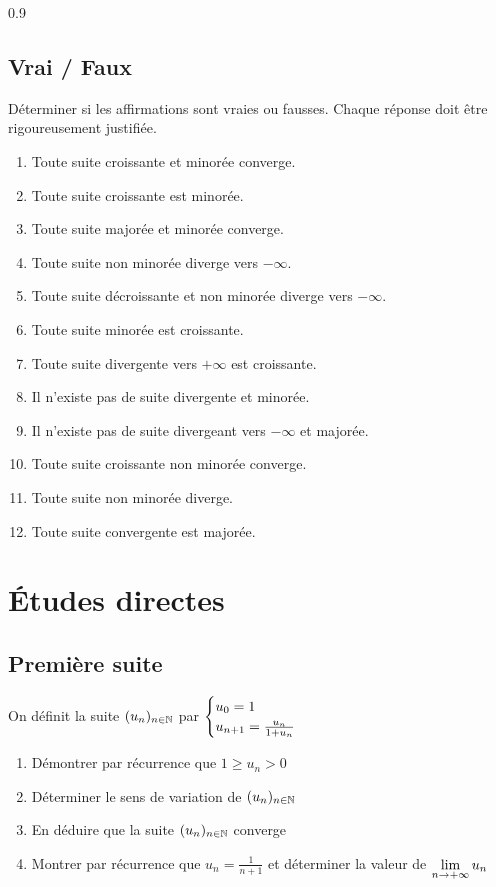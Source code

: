 \documentclass[oneside,12pt]{book}          %
\begin{document}
\begin{spacing}{0.9}
\subsection{Vrai / Faux}

Déterminer si les affirmations sont vraies ou fausses. Chaque réponse doit être rigoureusement justifiée.
\begin{enumerate}
	\item Toute suite croissante et minorée converge.
    \item Toute suite croissante est minorée.
    \item Toute suite majorée et minorée converge.
    \item Toute suite non minorée diverge vers $-\infty$.
    \item Toute suite décroissante et non minorée diverge vers $-\infty$.
    \item Toute suite minorée est croissante.
    \item Toute suite divergente vers $+\infty$ est croissante.
    \item Il n'existe pas de suite divergente et minorée.
    \item Il n'existe pas de suite divergeant vers $-\infty$ et majorée.
    \item Toute suite croissante non minorée converge.
	\item Toute suite non minorée diverge.
    \item Toute suite convergente est majorée.
\end{enumerate}



\section{Études directes}

\subsection{Première suite}
On définit la suite ${(u_{n})_{n\in\mathbb N}}$ par $\defsuite{u_0=1}{\frac{u_n}{1+u_n}}$
\begin{enumerate}
    \item Démontrer par récurrence que $1\geq u_n>0$
    \item Déterminer le sens de variation de ${(u_{n})_{n\in\mathbb N}}$
    \item En déduire que la suite ${(u_{n})_{n\in\mathbb N}}$ converge
    \item Montrer par récurrence que $u_n=\frac{1}{n+1}$  et déterminer la valeur de ${\lim\limits_{n\to +\infty}}\, u_n$
\end{enumerate}




\end{spacing}
\end{document}
